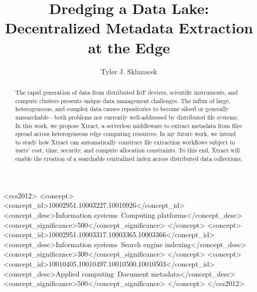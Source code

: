 \documentclass[sigconf, 9pt]{acmart}
\newcommand{\name}{Xtract}
\begin{document}
\title{Dredging a Data Lake: Decentralized Metadata Extraction at the Edge}

\author{Tyler J. Skluzacek} 


\renewcommand{\shortauthors}{Skluzacek et al.}

\begin{abstract}

The rapid generation of data from distributed IoT devices, scientific instruments, and compute clusters presents
unique data management challenges. The influx of large, heterogeneous, and complex data causes repositories to become 
siloed or generally unsearchable---both problems not currently well-addressed by distributed file systems.  
In this work, we propose \name{}, a serverless middleware 
to extract metadata from files spread across heterogeneous edge computing resources. 
In my future work, we intend to study how \name{} can
automatically construct file extraction workflows subject to 
users' cost, time, security, and compute allocation constraints. 
To this end, \name{} will enable the creation of a searchable centralized index across distributed data collections.


\end{abstract}

\begin{CCSXML}
<ccs2012>
<concept>
<concept_id>10002951.10003227.10010926</concept_id>
<concept_desc>Information systems~Computing platforms</concept_desc>
<concept_significance>500</concept_significance>
</concept>
<concept>
<concept_id>10002951.10003317.10003365.10003366</concept_id>
<concept_desc>Information systems~Search engine indexing</concept_desc>
<concept_significance>300</concept_significance>
</concept>
<concept>
<concept_id>10010405.10010497.10010500.10010503</concept_id>
<concept_desc>Applied computing~Document metadata</concept_desc>
<concept_significance>500</concept_significance>
</concept>
</ccs2012>
\end{CCSXML}



\maketitle
\end{document}
